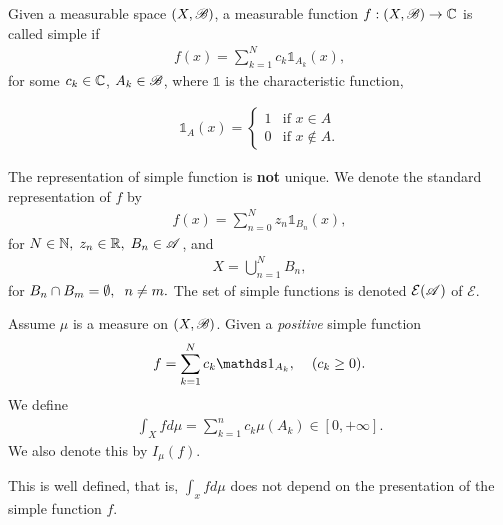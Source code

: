 \begin{definition}
    Given a measurable space $(X,\mathscr{B})$, a measurable function $f:(X,\mathscr{B})\rightarrow \mathbb{C}$ is called simple if 
    \begin{align*}
    f(x) = \sum_{k=1}^{N}c_k\mathds 1_{A_k}(x),    
    \end{align*}
for some $c_k\in\mathbb{C}$, $A_k\in \mathscr{B}$, where $\mathds 1$ is the characteristic function,

\begin{align*}
    \mathds 1_{A}(x)= \begin{cases} 
        1 & \text{if } x\in A \\
        0 & \text{if } x\notin A.
     \end{cases}
\end{align*}

The representation of simple function is \textbf{not} unique. We denote the standard representation of
$f$ by 
\begin{align*}
    f(x) = \sum_{n=0}^{N}z_n\mathds 1_{B_n}(x),
\end{align*}
for \(N\in\mathbb N,\hspace{1mm} z_n\in\mathbb{R},\hspace{1mm} B_n\in\mathscr{A}\), and 
\begin{align*}
    X=\bigcup_{n=1}^N B_n, 
\end{align*}
for \(B_n\cap B_m=\emptyset,\hspace{2mm} n\neq m.\)
The set of simple functions is denoted $\mathcal E(\mathscr{A})$ of $\mathcal E$. 

\end{definition}
\begin{definition}
    Assume $\mu$ is a measure on $(X,\mathscr{B})$. Given a \textit{positive} simple function
    \begin{align*}
        f = \sum_{k=1}^{N}c_k\mathds 1_{A_k},\hspace{4mm} (c_k\geq 0).
    \end{align*}
    We define \begin{align*}
        \int_X fd\mu =\sum_{k=1}^{n}c_k\mu(A_k)\in [0,+\infty].
    \end{align*}
    We also denote this by $I_\mu(f)$.
\end{definition}

\begin{lemma}
    This is well defined, that is, $\int_x fd\mu$ does not depend on the presentation of the simple function $f$.
\end{lemma}

